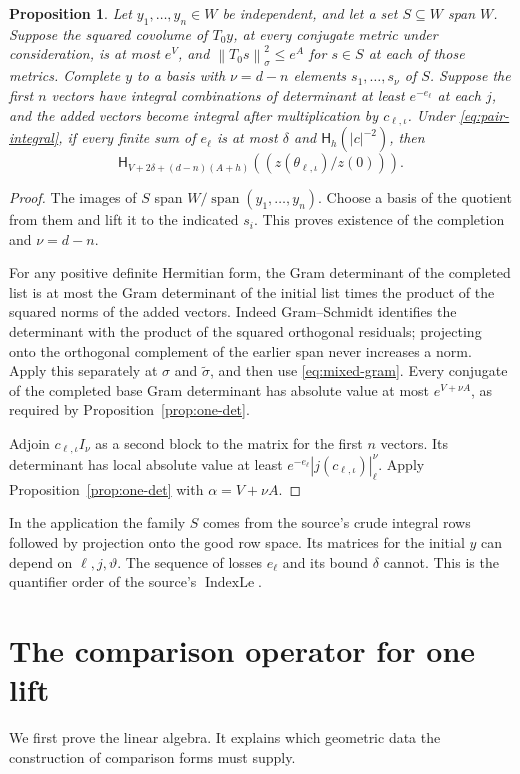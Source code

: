 \documentclass[11pt,a4paper]{article}
\newtheorem{proposition}[theorem]{Proposition}
\theoremstyle{definition}
\newcommand{\HH}[2]{\mathsf H_{#1}(#2)}
\newcommand{\vnorm}[1]{\left\lVert#1\right\rVert}
\newcommand{\abs}[1]{\left|#1\right|}
\newcommand{\Span}{\operatorname{span}}
\begin{document}
\begin{proposition}\label{prop:completion}
Let \(y_1,\ldots,y_n\in W\) be independent, and let a set \(S\subseteq W\)
span \(W\). Suppose the squared covolume of \(T_0y\), at every conjugate
metric under consideration, is at most \(e^V\), and
\(\vnorm{T_0s}_\sigma^2\le e^A\) for \(s\in S\) at each of those metrics.
Complete \(y\) to a basis with \(\nu=d-n\) elements \(s_1,\ldots,s_\nu\) of \(S\).
Suppose the first \(n\) vectors have integral combinations of determinant at least
\(e^{-e_\ell}\) at each \(j\), and the added vectors become integral after
multiplication by \(c_{\ell,\iota}\).
Under \eqref{eq:pair-integral}, if every finite sum of \(e_\ell\) is at most
\(\delta\) and \(\HH h{\abs c^{-2}}\), then
\[
 \HH{V+2\delta+(d-n)(A+h)}
       {\left(z(\theta_{\ell,\iota})/z(0)\right)} .
\]
\end{proposition}
\begin{proof}
The images of \(S\) span \(W/\Span(y_1,\ldots,y_n)\).
Choose a basis of the quotient from them and lift it to the indicated \(s_i\).
This proves existence of the completion and \(\nu=d-n\).

For any positive definite Hermitian form, the Gram determinant of the
completed list is at most the Gram determinant of the initial list times
the product of the squared norms of the added vectors.
Indeed Gram--Schmidt identifies the determinant with the product of the
squared orthogonal residuals; projecting onto the orthogonal complement
of the earlier span never increases a norm.
Apply this separately at \(\sigma\) and \(\tilde\sigma\), and then use
\eqref{eq:mixed-gram}. Every conjugate of the completed base Gram determinant
has absolute value at most \(e^{V+\nu A}\), as required by
Proposition~\ref{prop:one-det}.

Adjoin \(c_{\ell,\iota}I_\nu\) as a second block to the matrix for the
first \(n\) vectors. Its determinant has local absolute value at least
\(e^{-e_\ell}\abs{j(c_{\ell,\iota})}_\ell^\nu\).
Apply Proposition~\ref{prop:one-det} with \(\alpha=V+\nu A\).
\end{proof}

In the application the family \(S\) comes from the source's crude integral
rows followed by projection onto the good row space.
Its matrices for the initial \(y\) can depend on \(\ell,j,\vartheta\).
The sequence of losses \(e_\ell\) and its bound \(\delta\) cannot.
This is the quantifier order of the source's \(\operatorname{IndexLe}\).


\section{The comparison operator for one lift}\label{sec:comparison}
We first prove the linear algebra. It explains which geometric data the
construction of comparison forms must supply.
\end{document}
